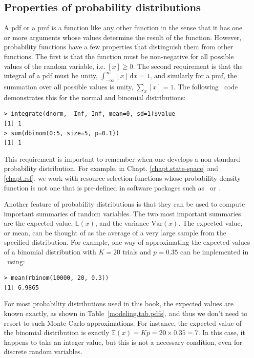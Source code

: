 \subsection{Properties of probability distributions}

A pdf or a pmf is a function like any other function
in the sense that it has one or more arguments whose values determine
the result of the function. However, probability functions have a few
properties that distinguish them from other functions.
The first is that the function
must be non-negative for all possible values of the random variable,
i.e. $[x] \geq 0$. The second requirement is that the integral of
a pdf must be unity, $\int_{-\infty}^{\infty} [x]\, \text{d}{x} = 1$, and similarly
for a pmf, the summation over all possible values is unity, $\sum_x [x]
= 1$. The following \R~code demonstrates
this for the normal and binomial distributions:
\begin{verbatim}
> integrate(dnorm, -Inf, Inf, mean=0, sd=1)$value
[1] 1
> sum(dbinom(0:5, size=5, p=0.1))
[1] 1
\end{verbatim}
This requirement is important to remember when one  develops a
non-standard probability distribution. For example, in Chapt.
\ref{chapt.state-space} and \ref{chapt.rsf},
we work with resource selection functions whose probability
density function is not one that is pre-defined in software packages
such as \R~or \bugs.

Another feature of probability distributions is that they can be used
to compute important summaries of random variables. The two most
important summaries are the expected value, $\mathbb{E}(x)$,
and the variance $\text{Var}(x)$. The expected value, or mean,
can be thought of as the average of a very large sample from the
specified distribution. For example, one way of approximating the
expected values of a binomial distribution with $K=20$ trials and
$p=0.35$ can be implemented in \R~using:
\begin{verbatim}
> mean(rbinom(10000, 20, 0.3))
[1] 6.9865
\end{verbatim}
For most probability distributions used in this book, the expected
values are known exactly, as shown in Table~\ref{modeling.tab.pdfs}, and
thus we don't need to resort to such Monte Carlo approximations. For instance, the
expected value of the binomial distribution is exactly $\mathbb{E}(x) = Kp =
20 \times 0.35 = 7$. In this case, it happens to take an integer
value, but this is not a necessary condition, even for discrete random
variables.

